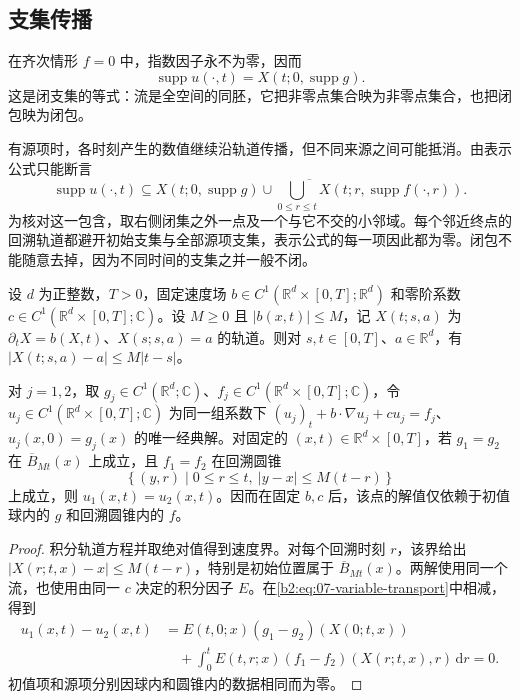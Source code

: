 \subsection{支集传播}
\label{b2:subsec:070303}

在齐次情形 \(f=0\) 中，指数因子永不为零，因而
\begin{equation}\label{b2:eq:07-support-flow}
 \operatorname{supp}u(\cdot,t)
 =X(t;0,\operatorname{supp}g).
\end{equation}
这是闭支集的等式：流是全空间的同胚，它把非零点集合映为非零点集合，也把闭包映为闭包。

\ProseParagraphBreak

有源项时，各时刻产生的数值继续沿轨道传播，但不同来源之间可能抵消。由表示公式只能断言
\[
 \operatorname{supp}u(\cdot,t)\subseteq
 \overline{X(t;0,\operatorname{supp}g)
 \cup\bigcup_{0\leq r\leq t}X(t;r,\operatorname{supp}f(\cdot,r))}.
\]
为核对这一包含，取右侧闭集之外一点及一个与它不交的小邻域。每个邻近终点的回溯轨道都避开初始支集与全部源项支集，表示公式的每一项因此都为零。闭包不能随意去掉，因为不同时间的支集之并一般不闭。

\begin{proposition}\label{b2:prop:07-finite-speed}
设 \(d\) 为正整数，\(T>0\)，固定速度场 \(b\in C^1(\mathbb R^d\times[0,T];\mathbb R^d)\) 和零阶系数 \(c\in C^1(\mathbb R^d\times[0,T];\mathbb C)\)。设 \(M\geq0\) 且 \(|b(x,t)|\leq M\)，记 \(X(t;s,a)\) 为 \(\partial_tX=b(X,t)\)、\(X(s;s,a)=a\) 的轨道。则对 \(s,t\in[0,T]\)、\(a\in\mathbb R^d\)，有 \(|X(t;s,a)-a|\leq M|t-s|\)。

对 \(j=1,2\)，取 \(g_j\in C^1(\mathbb R^d;\mathbb C)\)、\(f_j\in C^1(\mathbb R^d\times[0,T];\mathbb C)\)，令 \(u_j\in C^1(\mathbb R^d\times[0,T];\mathbb C)\) 为同一组系数下 \((u_j)_t+b\cdot\nabla u_j+cu_j=f_j\)、\(u_j(x,0)=g_j(x)\) 的唯一经典解。对固定的 \((x,t)\in\mathbb R^d\times[0,T]\)，若 \(g_1=g_2\) 在 \(\overline B_{Mt}(x)\) 上成立，且 \(f_1=f_2\) 在回溯圆锥
\[
 \{\,(y,r)\mid0\leq r\leq t,\ |y-x|\leq M(t-r)\,\}
\]
上成立，则 \(u_1(x,t)=u_2(x,t)\)。因而在固定 \(b,c\) 后，该点的解值仅依赖于初值球内的 \(g\) 和回溯圆锥内的 \(f\)。
\end{proposition}
\begin{proof}
积分轨道方程并取绝对值得到速度界。对每个回溯时刻 \(r\)，该界给出 \(|X(r;t,x)-x|\leq M(t-r)\)，特别是初始位置属于 \(\overline B_{Mt}(x)\)。两解使用同一个流，也使用由同一 \(c\) 决定的积分因子 \(E\)。在\eqref{b2:eq:07-variable-transport}中相减，得到
\[
 \begin{aligned}
 u_1(x,t)-u_2(x,t)
 &=E(t,0;x)(g_1-g_2)(X(0;t,x))\\
 &\quad+\int_0^t E(t,r;x)(f_1-f_2)(X(r;t,x),r)\,\mathrm dr=0.
 \end{aligned}
\]
初值项和源项分别因球内和圆锥内的数据相同而为零。
\end{proof}

